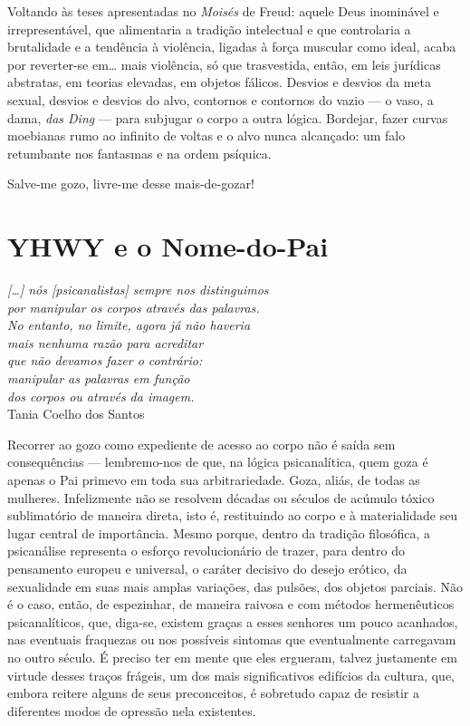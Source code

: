 Voltando às teses apresentadas no \emph{Moisés} de Freud: aquele Deus
inominável e irrepresentável, que alimentaria a tradição intelectual e
que controlaria a brutalidade e a tendência à violência, ligadas à força
muscular como ideal, acaba por reverter-se em\ldots{} mais violência, só que
trasvestida, então, em leis jurídicas abstratas, em teorias elevadas, em
objetos fálicos. Desvios e desvios da meta sexual, desvios e desvios do
alvo, contornos e contornos do vazio --- o vaso, a dama, \emph{das Ding}
--- para subjugar o corpo a outra lógica. Bordejar, fazer curvas
moebianas rumo ao infinito de voltas e o alvo nunca alcançado: um falo
retumbante nos fantasmas e na ordem psíquica.

Salve-me gozo, livre-me desse mais-de-gozar!

\section{YHWY e o Nome-do-Pai}

\begin{flushright}
\footnotesize
\emph{{[}\ldots{}{]} nós {[}psicanalistas{]} sempre nos distinguimos\\
por manipular os corpos através das palavras.\\
No entanto, no limite, agora já não haveria\\
mais nenhuma razão para acreditar \\
que não devamos fazer o contrário: \\
manipular as palavras em função \\
dos corpos ou através da imagem.}\\
Tania Coelho dos Santos
\end{flushright}

Recorrer ao gozo como expediente de acesso ao corpo não é saída sem
consequências --- lembremo-nos de que, na lógica psicanalítica, quem goza
é apenas o Pai primevo em toda sua arbitrariedade. Goza, aliás, de todas
as mulheres. Infelizmente não se resolvem décadas ou séculos de acúmulo
tóxico sublimatório de maneira direta, isto é, restituindo ao corpo e à
materialidade seu lugar central de importância. Mesmo porque, dentro da
tradição filosófica, a psicanálise representa o esforço revolucionário
de trazer, para dentro do pensamento europeu e universal, o caráter
decisivo do desejo erótico, da sexualidade em suas mais amplas
variações, das pulsões, dos objetos parciais. Não é o caso, então, de
espezinhar, de maneira raivosa e com métodos hermenêuticos
psicanalíticos, que, diga-se, existem graças a esses senhores um pouco
acanhados, nas eventuais fraquezas ou nos possíveis sintomas que
eventualmente carregavam no outro século. É preciso ter em mente que
eles ergueram, talvez justamente em virtude desses traços frágeis, um
dos mais significativos edifícios da cultura, que, embora reitere alguns
de seus preconceitos, é sobretudo capaz de resistir a diferentes modos
de opressão nela existentes.

